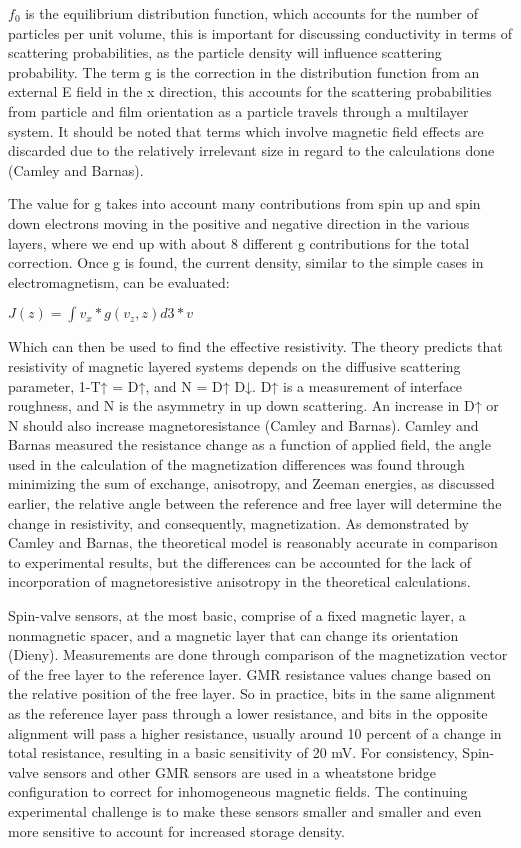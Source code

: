 \documentclass[11pt]{article}
\begin{document}
\begin{multicols}{2}
$f_0$ is the equilibrium distribution function, which accounts for the number of particles per unit volume, this is important for discussing conductivity in terms of scattering probabilities, as the particle density will influence scattering probability. The term g is the correction in the distribution function from an external E field in the x direction, this accounts for the scattering probabilities from particle and film orientation as a particle travels through a multilayer system. It should be noted that terms which involve magnetic field effects are discarded due to the relatively irrelevant size in regard to the calculations done (Camley and Barnas). 

The value for g takes into account many contributions from spin up and spin down electrons moving in the positive and negative direction in the various layers, where we end up with about 8 different g contributions for the total correction. Once g is found, the current density, similar to  the simple cases in electromagnetism,  can be evaluated:

$J(z) = ∫v_x*g(v_z,z)d3*v$

Which can then be used to find the effective resistivity. The theory predicts that resistivity of magnetic layered systems depends on the diffusive scattering parameter, 1-T↑ = D↑, and N = D↑ D↓.  D↑ is a measurement of interface roughness, and N is the asymmetry in up down scattering. An increase in D↑ or N should also increase magnetoresistance (Camley and Barnas). Camley and Barnas measured the resistance change as a function of applied field, the angle used in the calculation of the magnetization differences was found through minimizing the sum of exchange, anisotropy, and Zeeman energies, as discussed earlier, the relative angle between the reference and free layer will determine the change in resistivity, and consequently, magnetization. As demonstrated by Camley and Barnas, the theoretical model is reasonably accurate in comparison to experimental results, but the differences can be accounted for the lack of incorporation of magnetoresistive anisotropy in the theoretical calculations. 

Spin-valve sensors, at the most basic, comprise of a fixed magnetic layer, a nonmagnetic spacer, and a magnetic layer that can change its orientation (Dieny). Measurements  are done through comparison of the magnetization vector of the free layer to the reference layer. GMR resistance values change based on the relative position of the free layer. So in practice, bits in the same alignment as the reference layer pass through a lower resistance, and bits in the opposite alignment will pass a higher resistance, usually around 10 percent of a change in total resistance, resulting in a basic sensitivity of 20 mV. For consistency, Spin-valve sensors and other GMR sensors are used in a wheatstone bridge configuration to correct for inhomogeneous magnetic fields. The continuing experimental challenge is to make these sensors smaller and smaller and even more sensitive to account for increased storage density.




\end{multicols}
\end{document}
